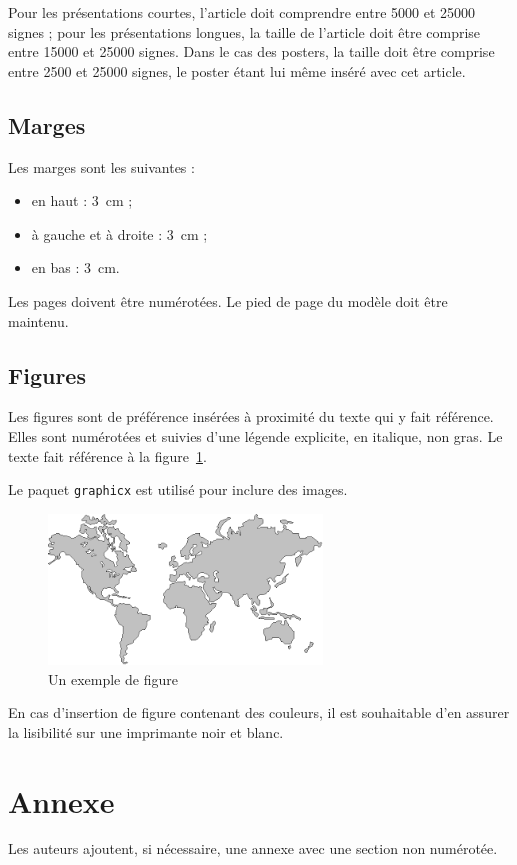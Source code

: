 \documentclass[city=Montpellier,year=2015]{jres}
\begin{document}
Pour les présentations courtes, l'article doit comprendre entre 5000
et 25000 signes ; pour les présentations longues, la taille de l'article
doit être comprise entre 15000 et 25000 signes. Dans le cas des posters,
la taille doit être comprise entre 2500 et 25000 signes, le poster étant
lui même inséré avec cet article.

\subsection{Marges}

Les marges sont les suivantes :

\begin{itemize}
    \item en haut : 3\ cm ;
    \item à gauche et à droite : 3\ cm ;
    \item en bas : 3\ cm.
\end{itemize}

Les pages doivent être numérotées. Le pied de page du modèle doit être
maintenu.

\subsection{Figures}

Les figures sont de préférence insérées à proximité du texte qui y
fait référence. Elles sont numérotées et suivies d'une légende
explicite, en italique, non gras. Le texte fait référence à la
figure~\ref{fig-exemple}.

Le paquet \texttt{graphicx} est utilisé pour inclure des images.

\begin{figure}[hbtf]
    \centerline{\includegraphics[height=4cm]{figure}}
    \caption{Un exemple de figure}
    \label{fig-exemple}
\end{figure}

En cas d'insertion de figure contenant des couleurs, il est souhaitable
d'en assurer la lisibilité sur une imprimante noir et blanc.

\section*{Annexe}

Les auteurs ajoutent, si nécessaire, une annexe avec une section non
numérotée.

\nocite{*}

\end{document}
